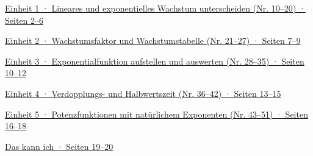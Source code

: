 \hyperlink{e1}{Einheit 1 · Lineares und exponentielles Wachstum unterscheiden (Nr. 10–20) · Seiten 2–6}\par\smallskip
\hyperlink{e2}{Einheit 2 · Wachstumsfaktor und Wachstumstabelle (Nr. 21–27) · Seiten 7–9}\par\smallskip
\hyperlink{e3}{Einheit 3 · Exponentialfunktion aufstellen und auswerten (Nr. 28–35) · Seiten 10–12}\par\smallskip
\hyperlink{e4}{Einheit 4 · Verdopplungs- und Halbwertszeit (Nr. 36–42) · Seiten 13–15}\par\smallskip
\hyperlink{e5}{Einheit 5 · Potenzfunktionen mit natürlichem Exponenten (Nr. 43–51) · Seiten 16–18}\par\smallskip
\hyperlink{abhaken}{Das kann ich · Seiten 19–20}\par\smallskip

